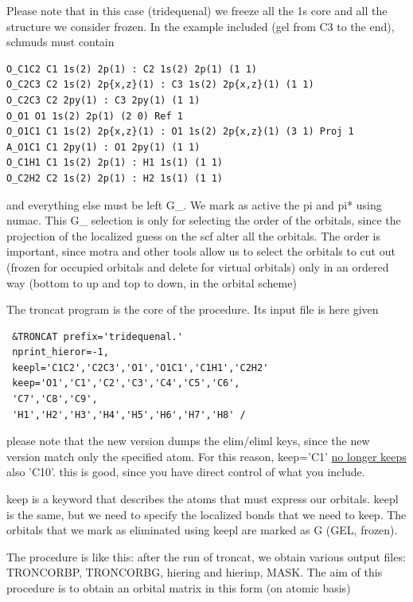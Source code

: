 \documentclass[a4paper,11pt]{report}
\begin{document}

Please note that in this case (tridequenal) we freeze all the 1s core and
all the structure we consider frozen. In the example included (gel from C3
to the end), schmuds must contain

\begin{verbatim}
O_C1C2 C1 1s(2) 2p(1) : C2 1s(2) 2p(1) (1 1)
O_C2C3 C2 1s(2) 2p{x,z}(1) : C3 1s(2) 2p{x,z}(1) (1 1)
O_C2C3 C2 2py(1) : C3 2py(1) (1 1)
O_O1 O1 1s(2) 2p(1) (2 0) Ref 1
O_O1C1 C1 1s(2) 2p{x,z}(1) : O1 1s(2) 2p{x,z}(1) (3 1) Proj 1
A_O1C1 C1 2py(1) : O1 2py(1) (1 1) 
O_C1H1 C1 1s(2) 2p(1) : H1 1s(1) (1 1)
O_C2H2 C2 1s(2) 2p(1) : H2 1s(1) (1 1)
\end{verbatim}

and everything else must be left G\_. We mark as active the pi and pi* using
numac. This G\_ selection is only for selecting the order of the orbitals, since
the projection of the localized guess on the scf alter all the orbitals. The
order is important, since motra and other tools allow us to select the
orbitals to cut out (frozen for occupied orbitals and delete for virtual
orbitals) only in an ordered way (bottom to up and top to down, in the
orbital scheme)

The troncat program is the core of the procedure. Its input file is here given

\begin{verbatim}
 &TRONCAT prefix='tridequenal.'
 nprint_hieror=-1,
 keepl='C1C2','C2C3','O1','O1C1','C1H1','C2H2'
 keep='O1','C1','C2','C3','C4','C5','C6',
 'C7','C8','C9',
 'H1','H2','H3','H4','H5','H6','H7','H8' /
\end{verbatim}

please note that the new version dumps the elim/eliml keys, since
the new version match only the specified atom. For this reason, keep='C1'
\underline{no longer keeps} also 'C10'. this is good, since you have direct
control of what you include.

keep is a keyword that describes the atoms that must express our orbitals.
keepl is the same, but we need to specify the localized bonds
that we need to keep. The orbitals that we mark as eliminated using keepl
are marked as G (GEL, frozen). 

The procedure is like this: after the run of troncat, we obtain various
output files: TRONCORBP, TRONCORBG, hiering and hierinp, MASK.
The aim of this procedure is to obtain an orbital matrix in this form (on
atomic basis)
\end{document}
